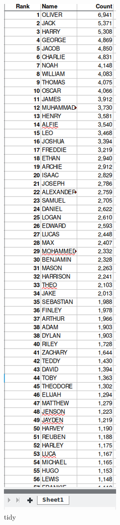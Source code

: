 \documentclass[]{book}
\begin{document}
\begin{figure}
\centering
\includegraphics{R/RDataWrangling/images/clean.png}
\caption{tidy}
\end{figure}
\end{document}
